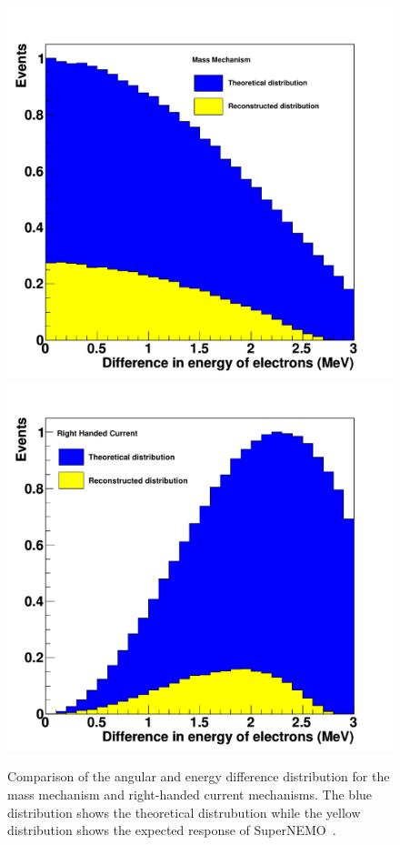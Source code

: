 \documentclass[main.tex]{subfiles}
\begin{document}
\begin{figure}[h!]
\begin{center}
\includegraphics[scale=0.27]{pictures/Chap2/Fig4c.pdf}
\includegraphics[scale=0.27]{pictures/Chap2/Fig4d.pdf}
\caption{Comparison of the angular and energy difference distribution for the mass mechanism and right-handed current mechanisms. The blue distribution shows the theoretical distrubution while the yellow distribution shows the expected response of SuperNEMO~\cite{ProbingNewPhysicsSN}.}
\label{TopologyDifferenceNMM-RHC}
\end{center}
\end{figure}
\end{document}
